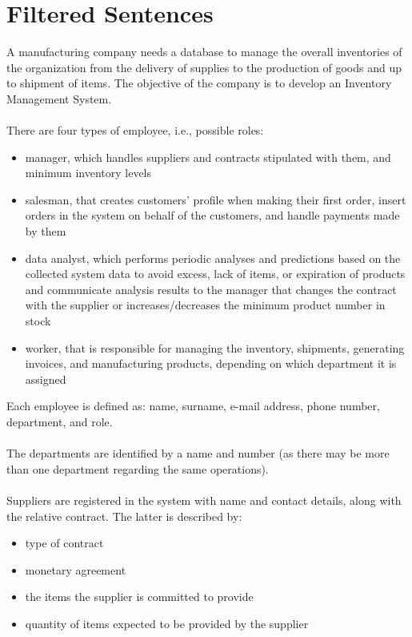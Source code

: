 \section{Filtered Sentences}

A manufacturing company needs a database to manage the overall inventories of the organization from the delivery of supplies to the production of goods and up to shipment of items. The objective of the company is to develop an Inventory Management System.\\\\
There are four types of employee, i.e., possible roles:
\begin{itemize}
	\item manager, which handles suppliers and contracts stipulated with them, and minimum inventory levels
	\item salesman, that creates customers' profile when making their first order, insert orders in the system on behalf of the customers, and handle payments made by them
	\item data analyst, which performs periodic analyses and predictions based on the collected system data to avoid excess, lack of items, or expiration of products and communicate analysis results to the manager that changes the contract with the supplier or increases/decreases the minimum product number in stock
	\item worker, that is responsible for managing the inventory, shipments, generating invoices, and manufacturing products, depending on which department it is assigned
\end{itemize}
\vspace{5pt}
Each employee is defined as: name, surname, e-mail address, phone number, department, and role.\\\\
The departments are identified by a name and number (as there may be more than one department regarding the same operations).\\\\
Suppliers are registered in the system with name and contact details, along with the relative contract. The latter is described by:
\begin{itemize}
	\item type of contract %
	\item monetary agreement
	\item the items the supplier is committed to provide
	\item quantity of items expected to be provided by the supplier
\end{itemize}
